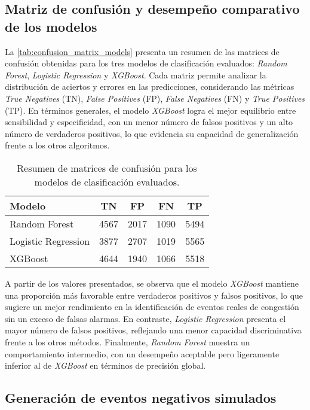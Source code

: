 \documentclass[12pt]{article}
\begin{document}
\subsection{Matriz de confusión y desempeño comparativo de los modelos}

La \autoref{tab:confusion_matrix_models} presenta un resumen de las matrices de confusión obtenidas para los tres modelos de clasificación evaluados: \textit{Random Forest}, \textit{Logistic Regression} y \textit{XGBoost}.
Cada matriz permite analizar la distribución de aciertos y errores en las predicciones, considerando las métricas \textit{True Negatives} (TN), \textit{False Positives} (FP), \textit{False Negatives} (FN) y \textit{True Positives} (TP).
En términos generales, el modelo \textit{XGBoost} logra el mejor equilibrio entre sensibilidad y especificidad, con un menor número de falsos positivos y un alto número de verdaderos positivos, lo que evidencia su capacidad de generalización frente a los otros algoritmos.

\begin{table}[H]
\centering
\caption{Resumen de matrices de confusión para los modelos de clasificación evaluados.}
\label{tab:confusion_matrix_models}
\begin{tabular}{lcccc}
\toprule
\textbf{Modelo} & \textbf{TN} & \textbf{FP} & \textbf{FN} & \textbf{TP} \\
\midrule
Random Forest        & 4567 & 2017 & 1090 & 5494 \\
Logistic Regression  & 3877 & 2707 & 1019 & 5565 \\
XGBoost              & 4644 & 1940 & 1066 & 5518 \\
\bottomrule
\end{tabular}
\end{table}

A partir de los valores presentados, se observa que el modelo \textit{XGBoost} mantiene una proporción más favorable entre verdaderos positivos y falsos positivos, lo que sugiere un mejor rendimiento en la identificación de eventos reales de congestión sin un exceso de falsas alarmas.
En contraste, \textit{Logistic Regression} presenta el mayor número de falsos positivos, reflejando una menor capacidad discriminativa frente a los otros métodos.
Finalmente, \textit{Random Forest} muestra un comportamiento intermedio, con un desempeño aceptable pero ligeramente inferior al de \textit{XGBoost} en términos de precisión global.

\subsection{Generación de eventos negativos simulados} \label{ssec:class_balancing}
\end{document}
